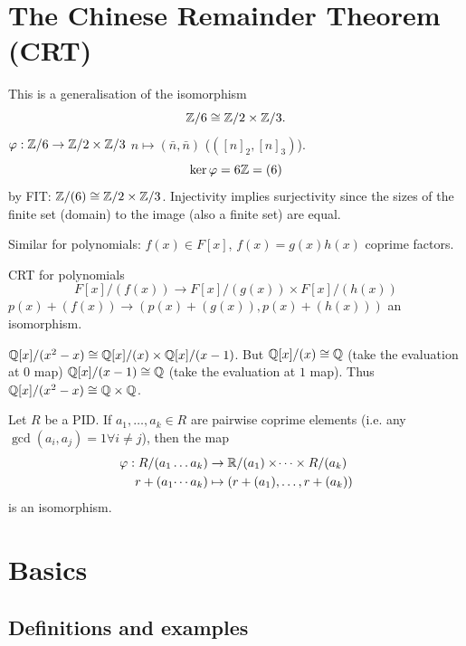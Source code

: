 \documentclass[10pt, a4paper]{article}
\begin{document}
\newpage

\section{The Chinese Remainder Theorem
    (CRT)}
This is a generalisation of the isomorphism
\[
\mathbb{Z} / 6 \cong \mathbb{Z} / 2 \times \mathbb{Z} / 3.
\]
$\varphi : \mathbb{Z} / 6 \to \mathbb{Z} / 2 \times \mathbb{Z} / 3$
$n \mapsto (\bar{n}, \bar{n})$
($([n]_2, [n]_3)$).
\[
\ker{\varphi} = 6\mathbb{Z} = (6)
\]
by FIT:
$\mathbb{Z} / (6) \cong \mathbb{Z} / 2 \times \mathbb{Z} / 3$.
Injectivity implies surjectivity since the sizes of the finite set
(domain)
to the image
(also a finite set)
are equal.

Similar for polynomials:
$f(x) \in F[x]$,
$f(x) = g(x)h(x)$ coprime factors.

CRT for polynomials
\[
F[x] / (f(x)) \to F[x] / (g(x)) \times F[x] / (h(x))
\]
$p(x) + (f(x)) \to (p(x) + (g(x)), p(x) + (h(x)))$ an isomorphism.

\begin{example}
    $\mathbb{Q}[x] / (x ^ 2 - x) \cong \mathbb{Q}[x] / (x) \times \mathbb{Q}[x] / (x - 1)$.
    But $\mathbb{Q}[x] / (x) \cong \mathbb{Q}$
    (take the evaluation at $0$ map)
    $\mathbb{Q}[x] / (x - 1) \cong \mathbb{Q}$
    (take the evaluation at $1$ map).
    Thus $\mathbb{Q}[x] / (x ^ 2 - x) \cong \mathbb{Q} \times \mathbb{Q}$.
\end{example}

\begin{theorem}
    Let $R$ be a PID.
    If $a_1, \dotsc, a_k \in R$ are pairwise coprime elements
    (i.e. any $\gcd(a_i, a_j) = 1 \forall i \neq j$),
    then the map
    \begin{align*}
        \varphi : R / (a_1 \dotsc a_k) &\to \mathbb{R} / (a_1) \times \dotsi \times R / (a_k) \\
        r + (a_1 \dotsi a_k) &\mapsto (r + (a_1), \dotsc, r + (a_k))
    \end{align*}
    is an isomorphism.
\end{theorem}

\newpage

\section{Basics}

\subsection{Definitions and examples}
\end{document}
